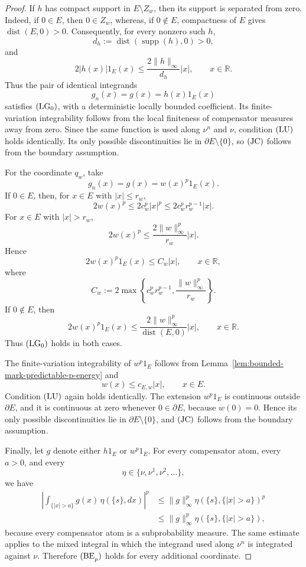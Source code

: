 \documentclass[a4paper,10pt]{article}
\begin{document}
\begin{proof}
If \(h\) has compact support in \(E\setminus Z_w\), then its support
is separated from zero. Indeed, if \(0\in E\), then \(0\in Z_w\),
whereas, if \(0\notin E\), compactness of \(E\) gives
$
        \operatorname{dist}(E,0)>0.
$
Consequently, for every nonzero such \(h\),
\[
        d_h
        :=
        \operatorname{dist}(\operatorname{supp}(h),0)
        >
        0,
\]
and
\[
        2|h(x)|1_E(x)
        \le
        \frac{2\lVert h\rVert_\infty}{d_h}|x|,
        \qquad x\in\mathbb R.
\]
Thus the pair of identical integrands
\[
        g_n(x)=g(x)=h(x)1_E(x)
\]
satisfies \({\rm (LG_0)}\), with a deterministic locally bounded
coefficient. Its finite-variation integrability follows from the
local finiteness of compensator measures away from zero.
Since the same function is used along \(\nu^n\) and \(\nu\),
condition \({\rm (LU)}\) holds identically. Its only possible
discontinuities lie in \(\partial E\setminus\{0\}\), so
\({\rm (JC)}\) follows from the boundary assumption.

For the coordinate \(q_w\), take
\[
        g_n(x)=g(x)=w(x)^p1_E(x).
\]
If \(0\in E\), then, for \(x\in E\) with \(|x|\le r_w\),
\[
        2w(x)^p
        \le
        2c_w^p|x|^p
        \le
        2c_w^pr_w^{p-1}|x|.
\]
For \(x\in E\) with \(|x|>r_w\),
\[
        2w(x)^p
        \le
        \frac{2\lVert w\rVert_\infty^p}{r_w}|x|.
\]
Hence
\[
        2w(x)^p1_E(x)
        \le
        C_w|x|,
        \qquad x\in\mathbb R,
\]
where
\[
        C_w
        :=
        2\max\left\{
        c_w^pr_w^{p-1},
        \frac{\lVert w\rVert_\infty^p}{r_w}
        \right\}.
\]
If \(0\notin E\), then
\[
        2w(x)^p1_E(x)
        \le
        \frac{2\lVert w\rVert_\infty^p}
             {\operatorname{dist}(E,0)}
        |x|,
        \qquad x\in\mathbb R.
\]
Thus \({\rm (LG_0)}\) holds in both cases.

The finite-variation integrability of \(w^p1_E\) follows from
Lemma~\ref{lem:bounded-mark-predictable-p-energy} and
\[
        w(x)\le c_{E,w}|x|,
        \qquad x\in E.
\]
Condition \({\rm (LU)}\) again holds identically. The extension
\(w^p1_E\) is continuous outside \(\partial E\), and it is continuous
at zero whenever \(0\in\partial E\), because \(w(0)=0\). Hence its
only possible discontinuities lie in
\(\partial E\setminus\{0\}\), and \({\rm (JC)}\) follows from the
boundary assumption.

Finally, let \(g\) denote either \(h1_E\) or \(w^p1_E\). For every
compensator atom, every \(a>0\), and every
\[
        \eta\in\{\nu,\nu^1,\nu^2,\ldots\},
\]
we have
\[
\begin{aligned}
\left|
\int_{\{|x|>a\}}
g(x)\,\eta(\{s\},dx)
\right|^p
&\le
\lVert g\rVert_\infty^p
\eta(\{s\},\{|x|>a\})^p
\\
&\le
\lVert g\rVert_\infty^p
\eta(\{s\},\{|x|>a\}),
\end{aligned}
\]
because every compensator atom is a subprobability measure. The same
estimate applies to the mixed integral in which the integrand used
along \(\nu^n\) is integrated against \(\nu\). Therefore
\({\rm (BE}_p{\rm )}\) holds for every additional coordinate.


\end{proof}
\end{document}
